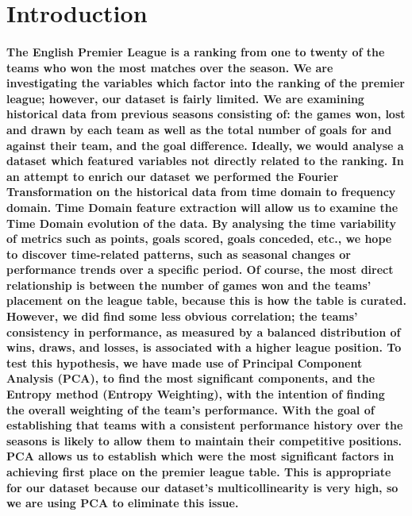 \section{Introduction}
% 
% 
\paragraph{The English Premier League is a ranking from one to twenty of the teams who won the most matches over the season. We are investigating the variables which factor into the ranking of the premier league; however, our dataset is fairly limited. We are examining historical data from previous seasons consisting of: the games won, lost and drawn by each team as well as the total number of goals for and against their team, and the goal difference. Ideally, we would analyse a dataset which featured variables not directly related to the ranking. In an attempt to enrich our dataset we performed the Fourier Transformation on the historical data from time domain to frequency domain. Time Domain feature extraction will allow us to examine the Time Domain evolution of the data. By analysing the time variability of metrics such as points, goals scored, goals conceded, etc., we hope to discover time-related patterns, such as seasonal changes or performance trends over a specific period. Of course, the most direct relationship is between the number of games won and the teams' placement on the league table, because this is how the table is curated. However, we did find some less obvious correlation; the teams' consistency in performance, as measured by a balanced distribution of wins, draws, and losses, is associated with a higher league position.  To test this hypothesis, we have made use of Principal Component Analysis (PCA), to find the most significant components, and the Entropy method (Entropy Weighting), with the intention of finding the overall weighting of the team's performance. With the goal of establishing that teams with a consistent performance history over the seasons is likely to allow them to maintain their competitive positions. PCA allows us to establish which were the most significant factors in achieving first place on the premier league table. This is appropriate for our dataset because our dataset's multicollinearity is very high, so we are using PCA to eliminate this issue. }